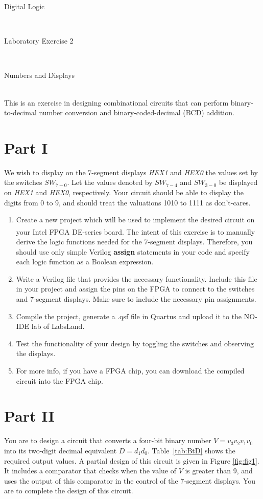 \documentclass[epsfig,10pt,fullpage]{article}
\newcommand{\LabNum}{2}
\begin{document}
\centerline{\huge Digital Logic}
~\\
\centerline{\huge Laboratory Exercise \LabNum}
~\\
\centerline{\large Numbers and Displays}
~\\

This is an exercise in designing combinational circuits that can perform
binary-to-decimal number conversion and binary-coded-decimal (BCD) addition.
~\\

\section*{Part I}
We wish to display on the 7-segment displays {\it HEX1} and {\it HEX0} the 
values set by the switches $SW_{7-0}$. 
Let the values denoted by $SW_{7-4}$ and $SW_{3-0}$ be displayed on {\it HEX1} and {\it HEX0}, 
respectively.
Your circuit should be able to display the digits from 0 to 9, and should treat the
valuations 1010 to 1111 as don't-cares.

\begin{enumerate}
\item Create a new project which will be used to implement the desired
circuit on your Intel\textsuperscript{\textregistered} FPGA DE-series board. The intent of this exercise is to manually 
derive the logic functions needed for the 7-segment displays. Therefore, you should use only
simple Verilog {\bf assign} statements in your code and specify each logic function as
a Boolean expression.
\item Write a Verilog file that provides the necessary functionality. Include this 
file in your project and assign the pins on the FPGA to connect to the 
switches and 7-segment displays. Make sure to include the necessary pin assignments.
\item Compile the project, generate a .qsf file in Quartus and upload it to the NO-IDE lab of LabsLand.
\item Test the functionality of your design by toggling the switches
and observing the displays.
\item For more info, if you have a FPGA chip, you can download the compiled circuit into the FPGA chip.
\end{enumerate}

\section*{Part II}
You are to design a circuit that converts a four-bit binary number $V = v_3 v_2 v_1 v_0$
into its two-digit decimal equivalent $D = d_1 d_0$. Table~\ref{tab:BtD} shows the required output
values. A partial design of this circuit is given in Figure \ref{fig:fig1}. It includes a comparator
that checks when the value of $V$ is greater than 9, and uses the output of this
comparator in the control of the 7-segment displays. You are to complete the design of
this circuit. 
\end{document}
